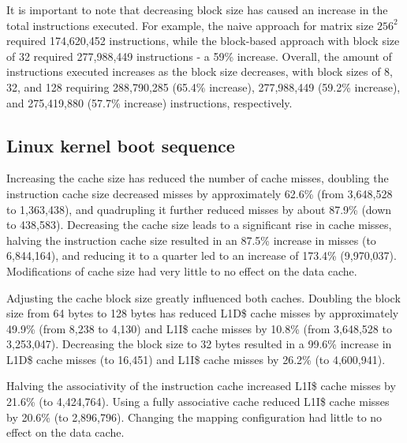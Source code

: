 \noindent It is important to note that decreasing block size has caused an increase in the total instructions executed. For example, the naive approach for matrix size \( 256^2 \) required
174,620,452 instructions, while the block-based approach with block size of 32 required 277,988,449 instructions - a 59\% increase. Overall, the amount of instructions executed
increases as the block size decreases, with block sizes of 8, 32, and 128 requiring 288,790,285 (65.4\% increase), 277,988,449 (59.2\% increase), and 275,419,880 (57.7\% increase)
instructions, respectively.

\subsection*{Linux kernel boot sequence} \label{sec:linux_boot_perf_conc}

Increasing the cache size has reduced the number of cache misses, doubling the instruction cache size decreased misses by approximately 62.6\% (from 3,648,528 to 1,363,438), and
quadrupling it further reduced misses by about 87.9\% (down to 438,583). Decreasing the cache size leads to a significant rise in cache misses, halving the instruction cache size
resulted in an 87.5\% increase in misses (to 6,844,164), and reducing it to a quarter led to an increase of 173.4\% (9,970,037). Modifications of cache size had very little to no
effect on the data cache.

Adjusting the cache block size greatly influenced both caches. Doubling the block size from 64 bytes to 128 bytes has reduced L1D\$ cache misses by approximately 49.9\% (from 8,238
to 4,130) and L1I\$ cache misses by 10.8\% (from 3,648,528 to 3,253,047). Decreasing the block size to 32 bytes resulted in a 99.6\% increase in L1D\$ cache misses (to 16,451) and
L1I\$ cache misses by 26.2\% (to 4,600,941).

Halving the associativity of the instruction cache increased L1I\$ cache misses by 21.6\% (to 4,424,764). Using a fully associative cache reduced L1I\$ cache misses by 20.6\% (to
2,896,796). Changing the mapping configuration had little to no effect on the data cache.

